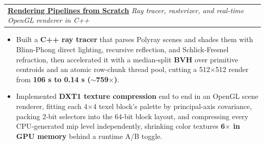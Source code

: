 \documentclass[letterpaper,11pt]{article}
\makeatletter
\newcommand{\SectionListBegin}{\begin{itemize}[leftmargin=0.15in, label={}]}
\newcommand{\BulletItems}[1]{
  \item
    \begin{itemize}[label={-}, leftmargin=*, labelsep=0.3em, topsep=0pt, partopsep=0pt, itemsep=0pt, parsep=0pt]
      \small #1
    \end{itemize}\vspace{-5pt}
}
\newcommand{\SLSubheadingItemLink}[4]{
  \vspace{-2pt}\item
    \begin{tabular*}{0.97\textwidth}[t]{l@{\extracolsep{\fill}}r}
      \textbf{\href{#2}{#1}} \textbar{} \textit{\small #3} & {\small #4} \\
    \end{tabular*}\vspace{-7pt}
}
\makeatother
\begin{document}
    \SLSubheadingItemLink
      {Rendering Pipelines from Scratch}{https://github.com/anupreetsingh/Rendering-pipelines}
      {Ray tracer, rasterizer, and real-time OpenGL renderer in C++}{} %
    \BulletItems{
      \item Built a \textbf{C++ ray tracer} that parses Polyray scenes and shades them with Blinn-Phong direct lighting, recursive reflection, and Schlick-Fresnel refraction, then accelerated it with a median-split \textbf{BVH} over primitive centroids and an atomic row-chunk thread pool, cutting a 512$\times$512 render from \textbf{106 s to 0.14 s ($\sim$759$\times$)}.
      \item Implemented \textbf{DXT1 texture compression} end to end in an OpenGL scene renderer, fitting each 4$\times$4 texel block's palette by principal-axis covariance, packing 2-bit selectors into the 64-bit block layout, and compressing every CPU-generated mip level independently, shrinking color textures \textbf{6$\times$ in GPU memory} behind a runtime A/B toggle.
    }
\end{document}
